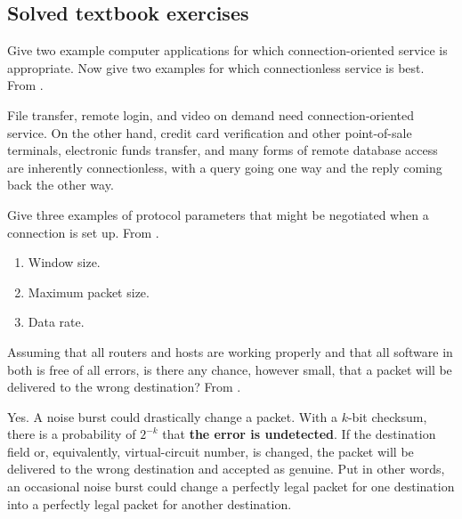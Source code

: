\documentclass[12pt, oneside]{book}
\begin{document}
\subsection{Solved textbook exercises}
\setcounter{Exercise}{0}

\begin{Exercise}
Give two example computer applications for which connection-oriented service is appropriate.
Now give two examples for which connectionless service is best.
From \cite{computer-networks-tanenbaum-2012}.
\end{Exercise}
\begin{Answer}
File transfer, remote login, and video on demand need connection-oriented service.
On the other hand, credit card verification and other point-of-sale terminals, electronic funds transfer, and many forms of remote database access are inherently connectionless, with a query going one way and the reply coming back the other way.
\end{Answer}

\begin{Exercise}
Give three examples of protocol parameters that might be negotiated when a connection is set up.
From \cite{computer-networks-tanenbaum-2012}.
\end{Exercise}
\begin{Answer}
\begin{enumerate}
    \item Window size.
    \item Maximum packet size.
    \item Data rate.
\end{enumerate}
\end{Answer}

\begin{Exercise}
Assuming that all routers and hosts are working properly and that all software in both is free of all errors, is there any chance, however small, that a packet will be delivered to the wrong destination?
From \cite{computer-networks-tanenbaum-2012}.
\end{Exercise}
\begin{Answer}
Yes. A noise burst could drastically change a packet. With a \(k\)-bit checksum, there is a probability of \(2^{-k}\) that \textbf{the error is undetected}. If the destination field or, equivalently, virtual-circuit number, is changed, the packet will be delivered to the wrong destination and accepted as genuine. Put in other words, an occasional noise burst could change a perfectly legal packet for one destination into a perfectly legal packet for another destination.
\end{Answer}
\end{document}
